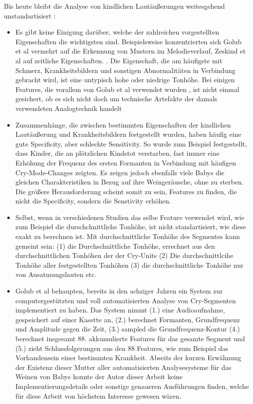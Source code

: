 Bis heute bleibt die Analyse von kindlichen Lautäußerungen weitesgehend unstandartisiert \cite[S. 142]{signal}:
\begin{itemize}
\item Es gibt keine Einigung darüber, welche der zahlreichen vorgestellten Eigenschaften die wichtigsten sind. Beispielsweise konzentrierten sich Golub et al \cite{cryModel} vermehrt auf die Erkennung von Mustern im Melodieverlauf, Zeskind et al auf zeitliche Eigenschaften. \cite{rythmic}. Die Eigenschaft, die am häufigste mit Schmerz, Krankheitsbildern und sonstigen Abnormalitäten in Verbindung gebracht wird, ist eine untypisch hohe oder niedrige Tonhöhe. Bei einigen Features, die vorallem von Golub et al verwendet wurden \cite{cryModel}, ist nicht einmal gesichert, ob es sich nicht doch um technische Artefakte der damals verwendeten Analogtechnik handelt \cite[S. 84 - 85]{parentalPerception}
\item Zusammenhänge, die zwischen bestimmten Eigenschaften der kindlichen Lautäußerung und Krankheitsbildern festgestellt wurden, haben häufig eine gute Specificity, aber schlechte Sensitivity. So wurde zum Beispiel festgestellt, dass Kinder, die an plötzlichen Kindstot verstarben, fast immer eine Erhöhung der Frequenz des ersten Formanten in Verbindung mit häufigen Cry-Mode-Changes zeigten. Es zeigen jedoch ebenfalls viele Babys die gleichen Charakteristiken in Bezug auf ihre Weingeräusche, ohne zu sterben. Die größere Herausforderung scheint somit zu sein, Features zu finden, die nicht die Specificity, sondern die Senstivity erhöhen.\cite[S. 85]{parentalPerception}
\item Selbst, wenn in verschiedenen Studien das selbe Feature verwendet wird, wie zum Beispiel die durschchnittliche Tonhöhe, ist nicht standartisiert, wie diese exakt zu berechnen ist. Mit \glqq durchschnittliche Tonhöhe des Segmentes\grqq{} kann gemeint sein: (1) die Durchschnittliche Tonhöhe, errechnet aus den durchschnittlichen Tonhöhen der der Cry-Units (2) Die durchschnittlcihe Tonhöhe aller festgestellten Tonhöhen (3) die durchschnittliche Tonhöhe nur von Ausatmungslauten etc.
\item Golub et al behaupten, bereits in den achziger Jahren ein System zur computergestützten und voll automatisierten Analyse von Cry-Segmenten implementiert zu haben. Das System nimmt (1.) eine Audioaufnahme, gespeichert auf einer Kasette an, (2.) berechnet Formanten, Grundfrequenz und Amplitude gegen die Zeit, (3.) sampled die Grundfrequenz-Kontur (4.) berechnet insgesamt 88. akkumulierte Features für das gesamte Segment und (5.) zieht Schlussfolgerungen aus den 88 Features, wie zum Beispiel das Vorhandensein einer bestimmten Krankheit.\cite[S. 75 - 76]{cryModel} Abseits der kurzen Erwähnung der Existenz dieser \grqq Mutter aller automatisierten Analysesysteme für das Weinen von Babys\grqq{} konnte der Autor dieser Arbeit keine Implementierungsdetails oder sonstige genaueren Ausführungen finden, welche für diese Arbeit von höchstem Interesse gewesen wären.
\end{itemize}



